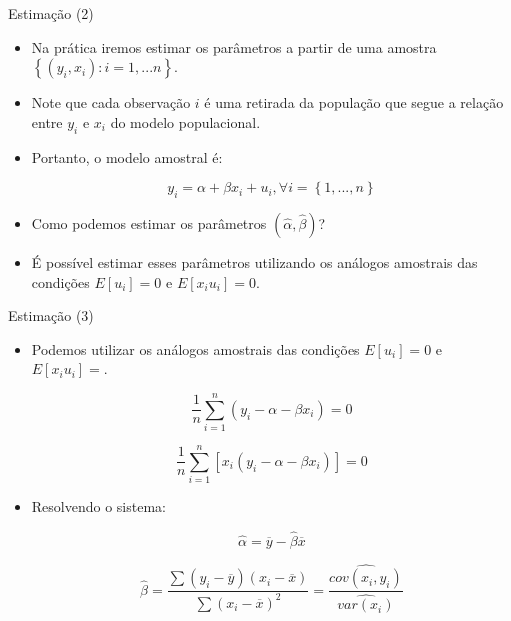 \documentclass[10pt,slides,xcolor=pdftex,dvipsnames,table]{beamer}
\begin{document}
\begin{frame}{Estimação (2)}

    \begin{itemize}\itemsep1.2em
    
     \item Na prática iremos estimar os parâmetros a partir de uma amostra $\left\{ (y_i, x_{i}): i=1,...n \right\}$. 
      
     \item Note que cada observação $i$ é uma retirada da população que segue a relação entre $y_i$ e $x_i$ do modelo populacional. 
     
     \item Portanto, o modelo amostral é:
     
     $$ y_i = \alpha + \beta x_i + u_i, \forall i = \left\{1,...,n \right\} $$
      
	 \item Como podemos estimar os parâmetros $(\hat{\alpha},\hat{\beta})$?
	 
	 \item É possível estimar esses parâmetros utilizando os análogos amostrais das condições $E[u_i] = 0$ e $E[x_i u_i ]=0$.  
	 
	 \end{itemize}
    
\end{frame}


\begin{frame}{Estimação (3)}

    \begin{itemize}\itemsep1.2em
    
     \item Podemos utilizar os análogos amostrais das condições $E[u_i] = 0$ e $E[x_i u_i ]=$.
     
     $$ \frac{1}{n} \sum_{i=1}^n \left( y_i - \alpha - \beta x_i \right) = 0 $$
     
     $$  \frac{1}{n} \sum_{i=1}^n  \left[ x_i \left( y_i - \alpha - \beta x_i \right) \right] = 0 $$
     
     \item Resolvendo o sistema:
     
     $$ \hat{\alpha} = \overline{y} - \hat{\beta} \overline{x} $$
     
     $$ \hat{\beta} = \frac{\sum (y_i - \overline{y})(x_i - \overline{x})}{\sum (x_i - \overline{x})^2} = \frac{\widehat{cov(x_i,y_i)}}{\widehat{var (x_i)}} $$
     
     \end{itemize}
    
\end{frame}
\end{document}
